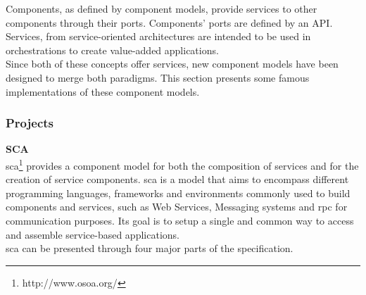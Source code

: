 Components, as defined by component models, provide services to other components through their ports. Components' ports are defined by an API. Services, from service-oriented architectures are intended to be used in orchestrations to create value-added applications.\\
Since both of these concepts offer services, new component models have been designed to merge both paradigms. This section presents some famous implementations of these component models.\\


\subsubsection{Projects}

{\bf SCA}\\

\gls{sca}\footnote{http://www.osoa.org/} provides a component model for both the composition of services and for the creation of service components.
\gls{sca} is a model that aims to encompass different programming languages, frameworks and environments commonly used to build components and services, such as Web Services, Messaging systems and \gls{rpc} for communication purposes. Its goal is to setup a single and common way to access and assemble service-based applications.\\
\gls{sca} can be presented through four major parts of the specification.\\

